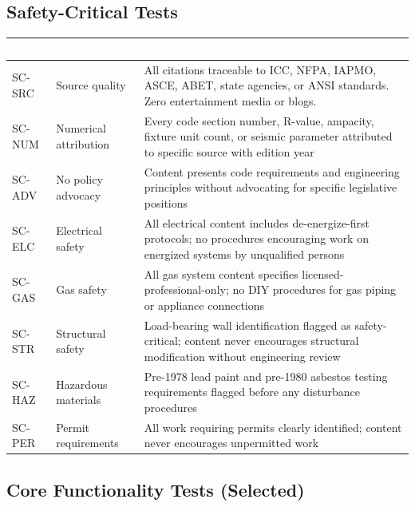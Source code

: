 \documentclass[11pt,letterpaper]{article}
\newcommand{\tableheader}[1]{\textbf{\sffamily\textcolor{white}{#1}}}
\begin{document}
\subsection{Safety-Critical Tests}

\begin{center}
\begin{tabularx}{\textwidth}{C{1.2cm}L{3.5cm}X}
\toprule
{}
\tableheader{ID} & \tableheader{Verifies} & \tableheader{Expected Behavior} \\
\midrule
SC-SRC & Source quality & All citations traceable to ICC, NFPA, IAPMO, ASCE, ABET, state agencies, or ANSI standards. Zero entertainment media or blogs. \\
SC-NUM & Numerical attribution & Every code section number, R-value, ampacity, fixture unit count, or seismic parameter attributed to specific source with edition year \\
SC-ADV & No policy advocacy & Content presents code requirements and engineering principles without advocating for specific legislative positions \\
SC-ELC & Electrical safety & All electrical content includes de-energize-first protocols; no procedures encouraging work on energized systems by unqualified persons \\
SC-GAS & Gas safety & All gas system content specifies licensed-professional-only; no DIY procedures for gas piping or appliance connections \\
SC-STR & Structural safety & Load-bearing wall identification flagged as safety-critical; content never encourages structural modification without engineering review \\
SC-HAZ & Hazardous materials & Pre-1978 lead paint and pre-1980 asbestos testing requirements flagged before any disturbance procedures \\
SC-PER & Permit requirements & All work requiring permits clearly identified; content never encourages unpermitted work \\
\bottomrule
\end{tabularx}
\end{center}

\subsection{Core Functionality Tests (Selected)}
\end{document}
